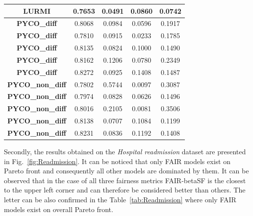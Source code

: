 \documentclass[preprint,12pt]{elsarticle}
\begin{document}
\begin{table}
\begin{tabular}{|c|c|c|c|c|}
		\textbf{LURMI}           & 0.7653       & 0.0491       & 0.0860       & 0.0742        \\ \hline
		\textbf{PYCO\_diff}      & 0.8068       & 0.0984       & 0.0596       & 0.1917        \\ \hline
		\textbf{PYCO\_diff}      & 0.7810       & 0.0915       & 0.0233       & 0.1785        \\ \hline
		\textbf{PYCO\_diff}      & 0.8135       & 0.0824       & 0.1000       & 0.1490        \\ \hline
		\textbf{PYCO\_diff}      & 0.8162       & 0.1206       & 0.0780       & 0.2349        \\ \hline
		\textbf{PYCO\_diff}      & 0.8272       & 0.0925       & 0.1408       & 0.1487        \\ \hline
		\textbf{PYCO\_non\_diff} & 0.7802       & 0.5744       & 0.0097       & 0.3087        \\ \hline
		\textbf{PYCO\_non\_diff} & 0.7974       & 0.0828       & 0.0626       & 0.1496        \\ \hline
		\textbf{PYCO\_non\_diff} & 0.8016       & 0.2105       & 0.0081       & 0.3506        \\ \hline
		\textbf{PYCO\_non\_diff} & 0.8138       & 0.0707       & 0.1084       & 0.1199        \\ \hline
		\textbf{PYCO\_non\_diff} & 0.8231       & 0.0836       & 0.1192       & 0.1408        \\ \hline
	\end{tabular}
	\label{tab:Adult}
\end{table}

Secondly, the results obtained on the \textit{Hospital readmission} dataset are presented in Fig.~\ref{fig:Readmission}. It can be noticed that only FAIR models exist on Pareto front and consequently all other models are dominated by them. It can be observed that in the case of all three fairness metrics FAIR-betaSF is the closest to the upper left corner and can therefore be considered better than others. The letter can be also confirmed in the Table~\ref{tab:Readmission} where only FAIR models exist on overall Pareto front.
\end{document}
